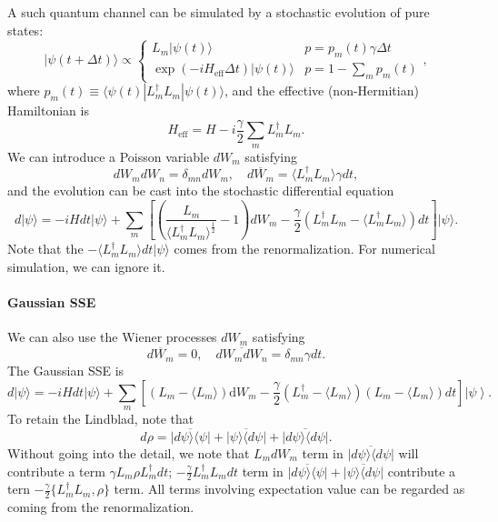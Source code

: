 \documentclass[aps,prb,superscriptaddress,nofootinbib]{revtex4}
\begin{document}
A such quantum channel can be simulated by a stochastic evolution of pure states:
\begin{equation}
	|\psi(t+\Delta t)\rangle \propto \begin{cases}
		L_m |\psi(t)\rangle & p = p_m(t) \gamma\Delta t \\
		\exp(-iH_{\mathrm{eff}}\Delta t)|\psi(t)\rangle & p = 1-\sum_m p_m(t)
	\end{cases},
\end{equation}
where $p_m(t)\equiv \langle\psi(t)|L_m^\dagger L_m|\psi(t)\rangle$, and the effective (non-Hermitian) Hamiltonian is
\begin{equation}
	H_{\mathrm{eff}} = H -i\frac{\gamma}{2}\sum_m L_m^\dagger L_m.
\end{equation}
We can introduce a Poisson variable $dW_m$ satisfying
\begin{equation}
	dW_m dW_n = \delta_{mn} dW_m,\quad
	\overline{dW_m} = \langle L_m^\dagger L_m\rangle\gamma dt,
\end{equation}
and the evolution can be cast into the stochastic differential equation
\begin{equation}\label{eq:OS-SSE-Poisson}
	d|\psi\rangle = -iHdt |\psi\rangle + \sum_m \left[\left(\frac{L_m}{\langle L_m^\dagger L_m\rangle^{\frac{1}{2}}}-1\right)dW_m -\frac{\gamma}{2} \left(L_m^\dagger L_m-\langle L_m^\dagger L_m\rangle\right)dt \right]
	  |\psi\rangle.
\end{equation}
Note that the $-\langle L_m^\dagger L_m\rangle dt |\psi\rangle$ comes from the renormalization.
For numerical simulation, we can ignore it.



\paragraph*{Gaussian SSE}

We can also use the Wiener processes $dW_m$ satisfying 
\begin{equation}
	\overline{dW_m} = 0,\quad
	\overline{dW_m dW_n} = \delta_{mn} \gamma dt.
\end{equation}
The Gaussian SSE is
\begin{equation}
	d |\psi\rangle = -i H dt |\psi\rangle + 
	\sum_m \left[\left(L_m-\langle L_m\rangle\right) \mathrm{d} W_{m}-\frac{\gamma}{2}\left(L_m^\dagger-\langle L_m\rangle\right)\left(L_m-\langle L_m\rangle\right) dt\right]\left|\psi\right\rangle.
\end{equation}
To retain the Lindblad, note that
\begin{equation}
	d\rho = \overline{|d\psi\rangle\langle\psi|} + \overline{|\psi\rangle \langle d\psi|}+ \overline{|d\psi\rangle\langle d\psi|}.
\end{equation}
Without going into the detail, we note that $L_m dW_m$ term in $\overline{|d\psi\rangle\langle d\psi|}$ will contribute a term $\gamma L_m \rho L_m^\dagger dt$; $-\frac{\gamma}{2}L_m^\dagger L_m dt$ term in $\overline{|d\psi\rangle\langle\psi|} + \overline{|\psi\rangle \langle d\psi|}$ contribute a tern $-\frac{\gamma}{2}\{L_m^\dagger L_m, \rho\}$ term.
All terms involving expectation value can be regarded as coming from the renormalization.
\end{document}
